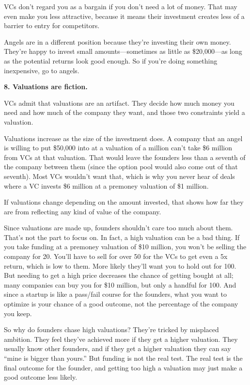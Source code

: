 VCs don't regard you as a bargain if you don't need a lot of money. That
may even make you less attractive, because it means their investment
creates less of a barrier to entry for competitors.

Angels are in a different position because they're investing their own
money. They're happy to invest small amounts---sometimes as little as
\$20,000---as long as the potential returns look good enough. So if
you're doing something inexpensive, go to angels.

\textbf{8. Valuations are fiction.}

VCs admit that valuations are an artifact. They decide how much money
you need and how much of the company they want, and those two
constraints yield a valuation.

Valuations increase as the size of the investment does. A company that
an angel is willing to put \$50,000 into at a valuation of a million
can't take \$6 million from VCs at that valuation. That would leave the
founders less than a seventh of the company between them (since the
option pool would also come out of that seventh). Most VCs wouldn't want
that, which is why you never hear of deals where a VC invests \$6
million at a premoney valuation of \$1 million.

If valuations change depending on the amount invested, that shows how
far they are from reflecting any kind of value of the company.

Since valuations are made up, founders shouldn't care too much about
them. That's not the part to focus on. In fact, a high valuation can be
a bad thing. If you take funding at a premoney valuation of \$10
million, you won't be selling the company for 20. You'll have to sell
for over 50 for the VCs to get even a 5x return, which is low to them.
More likely they'll want you to hold out for 100. But needing to get a
high price decreases the chance of getting bought at all; many companies
can buy you for \$10 million, but only a handful for 100. And since a
startup is like a pass/fail course for the founders, what you want to
optimize is your chance of a good outcome, not the percentage of the
company you keep.

So why do founders chase high valuations? They're tricked by misplaced
ambition. They feel they've achieved more if they get a higher
valuation. They usually know other founders, and if they get a higher
valuation they can say ``mine is bigger than yours.'' But funding is not
the real test. The real test is the final outcome for the founder, and
getting too high a valuation may just make a good outcome less likely.

